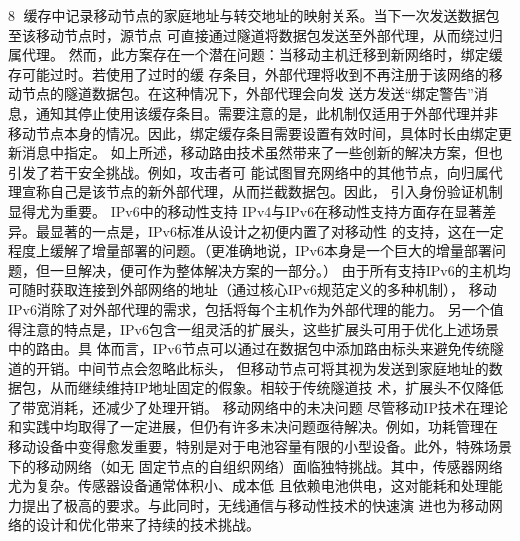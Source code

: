                                                    8
缓存中记录移动节点的家庭地址与转交地址的映射关系。当下一次发送数据包至该移动节点时，源节点
可直接通过隧道将数据包发送至外部代理，从而绕过归属代理。
然而，此方案存在一个潜在问题：当移动主机迁移到新网络时，绑定缓存可能过时。若使用了过时的缓
存条目，外部代理将收到不再注册于该网络的移动节点的隧道数据包。在这种情况下，外部代理会向发
送方发送“绑定警告”消息，通知其停止使用该缓存条目。需要注意的是，此机制仅适用于外部代理并非
移动节点本身的情况。因此，绑定缓存条目需要设置有效时间，具体时长由绑定更新消息中指定。
如上所述，移动路由技术虽然带来了一些创新的解决方案，但也引发了若干安全挑战。例如，攻击者可
能试图冒充网络中的其他节点，向归属代理宣称自己是该节点的新外部代理，从而拦截数据包。因此，
引入身份验证机制显得尤为重要。
IPv6中的移动性支持
IPv4与IPv6在移动性支持方面存在显著差异。最显著的一点是，IPv6标准从设计之初便内置了对移动性
的支持，这在一定程度上缓解了增量部署的问题。（更准确地说，IPv6本身是一个巨大的增量部署问
题，但一旦解决，便可作为整体解决方案的一部分。）
由于所有支持IPv6的主机均可随时获取连接到外部网络的地址（通过核心IPv6规范定义的多种机制），
移动IPv6消除了对外部代理的需求，包括将每个主机作为外部代理的能力。
另一个值得注意的特点是，IPv6包含一组灵活的扩展头，这些扩展头可用于优化上述场景中的路由。具
体而言，IPv6节点可以通过在数据包中添加路由标头来避免传统隧道的开销。中间节点会忽略此标头，
但移动节点可将其视为发送到家庭地址的数据包，从而继续维持IP地址固定的假象。相较于传统隧道技
术，扩展头不仅降低了带宽消耗，还减少了处理开销。
移动网络中的未决问题
尽管移动IP技术在理论和实践中均取得了一定进展，但仍有许多未决问题亟待解决。例如，功耗管理在
移动设备中变得愈发重要，特别是对于电池容量有限的小型设备。此外，特殊场景下的移动网络（如无
固定节点的自组织网络）面临独特挑战。其中，传感器网络尤为复杂。传感器设备通常体积小、成本低
且依赖电池供电，这对能耗和处理能力提出了极高的要求。与此同时，无线通信与移动性技术的快速演
进也为移动网络的设计和优化带来了持续的技术挑战。


